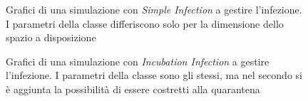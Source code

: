 \documentclass[a4paper,10pt,twocolumn]{article}
\begin{document}
\begin{figure}[p]
    \caption{Grafici di una simulazione con \emph{Simple Infection} a gestire l'infezione. I parametri della classe differiscono solo per la dimensione dello spazio a disposizione}
\end{figure}

\begin{figure}[p]
    \centering
    \caption{Grafici di una simulazione con \emph{Incubation Infection} a gestire l'infezione. I parametri della classe sono gli stessi, ma nel secondo si è aggiunta la possibilità di essere costretti alla quarantena}
\end{figure}
\end{document}
